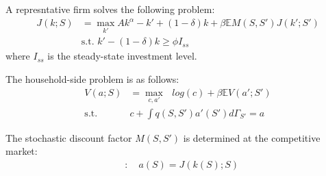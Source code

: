 A represntative firm solves the following problem:
\begin{align*}
  J(k;S) &= \max_{k'} Ak^{\alpha}  -k' + (1-\delta)k + \beta\mathbb{E}M(S,S')J(k';S')
  \\
  &\text{s.t. } k' - (1-\delta)k \geq \phi I_{ss}
\end{align*}
where $I_{ss}$ is the steady-state investment level.

The household-side problem is as follows:
\begin{align*}
  V(a;S) &= \max_{c,a'}\text{ } log(c) + \beta \mathbb{E}V(a';S')
  \\
  \text{s.t.}\quad& c + \int q(S,S') a'(S') d\Gamma_{S'} =  a
\end{align*}

The stochastic discount factor $M(S,S')$ is determined at the competitive market:
\begin{align*}
  [M]&:\quad a(S) = J(k(S);S)
\end{align*}

